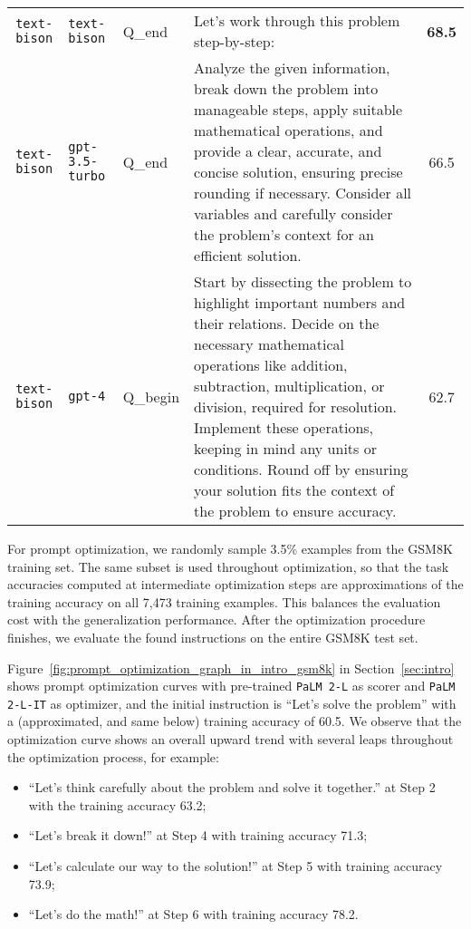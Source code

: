 \begin{table}[t]
\begin{center}
{\begin{tabular}{cP{2cm}P{1.5cm}P{8cm}c}
\texttt{text-bison} & \texttt{text-bison} & Q\_end & Let's work through this problem step-by-step: & \textbf{68.5} \\ [1ex]
\texttt{text-bison} & \texttt{gpt-3.5-turbo} & Q\_end & Analyze the given information, break down the problem into manageable steps, apply suitable mathematical operations, and provide a clear, accurate, and concise solution, ensuring precise rounding if necessary. Consider all variables and carefully consider the problem's context for an efficient solution. & 66.5 \\ [5ex]
\texttt{text-bison} & \texttt{gpt-4} & Q\_begin & Start by dissecting the problem to highlight important numbers and their relations. Decide on the necessary mathematical operations like addition, subtraction, multiplication, or division, required for resolution. Implement these operations, keeping in mind any units or conditions. Round off by ensuring your solution fits the context of the problem to ensure accuracy. & 62.7 \\
\bottomrule
\end{tabular}}
\end{center}
\label{table:top_instructions_on_gsm8k}
\end{table}

For prompt optimization, we randomly sample 3.5\% examples from the GSM8K training set.
The same subset is used throughout optimization, so that the task accuracies computed at intermediate optimization steps are approximations of the training accuracy on all 7,473 training examples.
This balances the evaluation cost with the generalization performance.
After the optimization procedure finishes, we evaluate the found instructions on the entire GSM8K test set.

Figure~\ref{fig:prompt_optimization_graph_in_intro_gsm8k} in Section~\ref{sec:intro} shows prompt optimization curves with pre-trained \texttt{PaLM 2-L} as scorer and \texttt{PaLM 2-L-IT} as optimizer, and the initial instruction is ``Let's solve the problem'' with a (approximated, and same below) training accuracy of 60.5.
We observe that the optimization curve shows an overall upward trend with several leaps throughout the optimization process, for example:
\begin{itemize}[leftmargin=2em,topsep=0pt,partopsep=1ex,parsep=0ex]
\item ``Let's think carefully about the problem and solve it together.'' at Step 2 with the training accuracy 63.2;
\item ``Let's break it down!'' at Step 4 with training accuracy 71.3;
\item ``Let's calculate our way to the solution!'' at Step 5 with training accuracy 73.9;
\item ``Let's do the math!'' at Step 6 with training accuracy 78.2.
\end{itemize}

